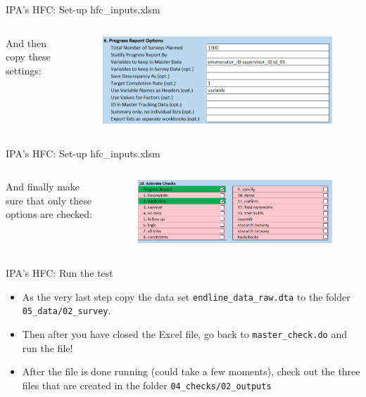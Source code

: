 \documentclass[aspectratio=169]{beamer}
\begin{document}
\begin{frame}{IPA's HFC: Set-up hfc\_inputs.xlsm}
	\begin{columns}[c]
		
		\small And then copy these settings:
		
		\begin{figure}
			\centering
			\includegraphics[width=\linewidth]{img/ipacheck-setup-3.png}
		\end{figure}
	\end{columns}
\end{frame}

\begin{frame}{IPA's HFC: Set-up hfc\_inputs.xlsm}
	\begin{columns}[c]
		
		\column{.22\linewidth}
		\small And finally make sure that only these options are checked:
		
		\column{.78\linewidth}
		\begin{figure}
			\centering
			\includegraphics[width=\linewidth]{img/ipacheck-setup-4.png}
		\end{figure}
	\end{columns}
\end{frame}

\begin{frame}{IPA's HFC: Run the test}

	\begin{itemize}
		\item As the very last step copy the data set \texttt{endline\_data\_raw.dta} to the folder \texttt{05\_data/02\_survey}. 
		\item Then after you have closed the Excel file, go back to \texttt{master\_check.do} and run the file!
		\item After the file is done running (could take a few moments), check out the three files that are created in the folder \texttt{04\_checks/02\_outputs}
	\end{itemize}
\end{frame}
\end{document}
